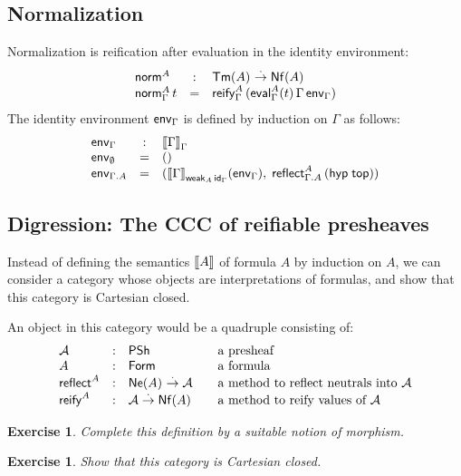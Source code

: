 \documentclass[a4paper]{article}
\newtheorem{exercise}[theorem]{Exercise}
\begin{document}
\subsection{Normalization}

Normalization is reification after evaluation in the identity
environment:
\[
\begin{array}{lcl}
\tnorm^A & : & \Tm A \todot \Nf A \\
\norm[\Gamma] A t & = & \reify[\Gamma]A {(\eval[\Gamma] A t \,\Gamma\, \env[\Gamma])}
\end{array}
\]
The identity environment $\env[\Gamma]$ is defined by induction on
$\Gamma$ as follows:
\[
\begin{array}{lcl}
  \env[\Gamma] & : & \den \Gamma _\Gamma \\
  \env[\cempty] & = & () \\
  \env[\Gamma.A] & = & (\den\Gamma_{\weak[A] \id[\Gamma]}(\env[\Gamma]), \;
                          \reflect[\Gamma.A] A {(\hyp \ttop)})
\end{array}
\]

\subsection{Digression: The CCC of reifiable presheaves}

Instead of defining the semantics $\den A$ of formula $A$ by induction
on $A$, we can consider a category whose objects are interpretations
of formulas, and show that this category is Cartesian closed.

An object in this category would be a quadruple consisting of:
\[
\begin{array}{lll@{\qquad}l}
  \A & : & \PSh  & \mbox{a presheaf} \\
  A  & : & \Form & \mbox{a formula} \\
  \treflect^A & : & \Ne A \todot \A
    & \mbox{a method to reflect neutrals into $\A$} \\
  \treify^A & : & \A \todot \Nf A
    & \mbox{a method to reify values of $\A$} \\
\end{array}
\]
\begin{exercise}
  Complete this definition by a suitable notion of morphism.
\end{exercise}
\begin{exercise}
  Show that this category is Cartesian closed.
\end{exercise}


\end{document}

